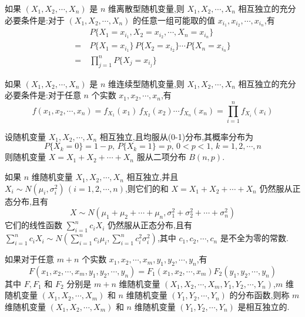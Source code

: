 \begin{conclusion}
    如果 $(X_1,X_2,\cdots,X_n)$ 是 $n$ 维离散型随机变量,则 $X_1,X_2,\cdots,X_n$ 相互独立的充分必要条件是:对于 $(X_1,X_2,\cdots,X_n)$ 的任意一组可能取的值 $x_{i_1}, x_{i_2}, \cdots, x_{i_n}$,有
    $$
    \begin{aligned}
        & P\{X_1 = x_{i_1}, X_2 = x_{i_2}, \cdots, X_n = x_{i_n}\} \\
        = \  & P\{X_1 = x_{i_1}\} \, P\{X_2 = x_{i_2}\} \cdots P\{X_n = x_{i_n}\} \\
        = \  & \prod_{j=1}^n P\{X_j = x_{i_j}\}
    \end{aligned}
    $$
\end{conclusion}

\begin{conclusion}
    如果 $(X_1,X_2,\cdots,X_n)$ 是 $n$ 维连续型随机变量,则 $X_1,X_2,\cdots,X_n$ 相互独立的充分必要条件是:对于任意 $n$ 个实数 $x_1,x_2,\cdots,x_n$,有
    $$
    f(x_1,x_2,\cdots,x_n) = f_{X_1}(x_1) \, f_{X_2}(x_2) \cdots f_{X_n}(x_n) = \prod_{i=1}^n f_{X_i}(x_i)
    $$
\end{conclusion}

\begin{conclusion}
    设随机变量 $X_1,X_2,\cdots,X_n$ 相互独立,且均服从(0-1)分布,其概率分布为
    $$
    P\{ X_k=0 \} = 1-p, \, P\{ X_k=1 \} = p, \, 0<p<1, \, k=1,2,\cdots,n
    $$
    则随机变量 $X = X_1 + X_2 + \cdots + X_n$ 服从二项分布 $B(n,p)$.
\end{conclusion}

\begin{conclusion}
    如果 $n$ 维随机变量 $X_1,X_2,\cdots,X_n$ 相互独立,并且 $X_i \sim N(\mu_i, \sigma_i^2) \, (i=1,2,\cdots,n)$,则它们的和 $X = X_1 + X_2 + \cdots + X_n$ 仍然服从正态分布,且有
    $$
    X \sim N(\mu_1 + \mu_2 + \cdots + \mu_n, \sigma_1^2 + \sigma_2^2 + \cdots + \sigma_n^2)
    $$
    它们的线性函数 $\displaystyle\sum_{i=1}^n c_i X_i$ 仍然服从正态分布,且有 $\displaystyle\sum_{i=1}^n c_i X_i \sim N(\displaystyle\sum_{i=1}^n c_i \mu_i, \displaystyle\sum_{i=1}^n c_i^2 \sigma_i^2)$,其中 $c_1,c_2,\cdots,c_n$ 是不全为零的常数.
\end{conclusion}

\begin{definition}
    如果对于任意 $m+n$ 个实数 $x_1,x_2,\cdots,x_m,y_1,y_2,\cdots,y_n$,有
    $$
    F(x_1,x_2,\cdots,x_m,y_1,y_2,\cdots,y_n) = F_1(x_1,x_2,\cdots,x_m) F_2(y_1,y_2,\cdots,y_n)
    $$
    其中 $F,F_1$ 和 $F_2$ 分别是 $m+n$ 维随机变量 $(X_1,X_2,\cdots,X_m,Y_1,Y_2,\cdots,Y_n)$,$m$ 维随机变量 $(X_1,X_2,\cdots,X_m)$ 和 $n$ 维随机变量 $(Y_1,Y_2,\cdots,Y_n)$ 的分布函数,则称 $m$ 维随机变量 $(X_1,X_2,\cdots,X_m)$ 和 $n$ 维随机变量 $(Y_1,Y_2,\cdots,Y_n)$ 是相互独立的.
\end{definition}

